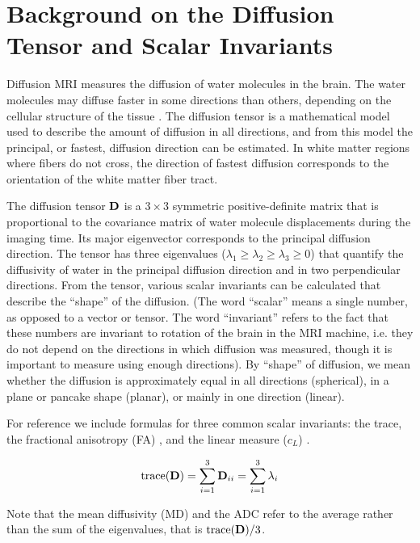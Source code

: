 \documentclass{InsightArticle}
\begin{document}
\section{Background on the Diffusion Tensor and Scalar Invariants}
Diffusion MRI measures the diffusion of water molecules in the brain.
The water molecules may diffuse faster in some directions than others,
depending on the cellular structure of the tissue \cite{beaulieu02,
pierpaoli96} . The diffusion tensor is a mathematical model
\cite{basserBIOPHYS94} used to describe the amount of diffusion in all
directions, and from this model the principal, or fastest, diffusion
direction can be estimated. In white matter regions where fibers do
not cross, the direction of fastest diffusion corresponds to the
orientation of the white matter fiber tract.

The diffusion tensor ${\bf D}$ is a $3 \times 3$ symmetric
positive-definite matrix that is proportional to the covariance matrix
of water molecule displacements during the imaging time.  Its major
eigenvector corresponds to the principal diffusion direction.  The
tensor has three eigenvalues ($\lambda_1 \geq \lambda_2 \geq \lambda_3
\geq 0$) that quantify the diffusivity of water in the principal
diffusion direction and in two perpendicular directions. From the
tensor, various scalar invariants can be calculated that describe the
``shape'' of the diffusion.  (The word ``scalar'' means a single
number, as opposed to a vector or tensor.  The word ``invariant''
refers to the fact that these numbers are invariant to rotation of the
brain in the MRI machine, i.e. they do not depend on the directions in
which diffusion was measured, though it is important to measure using
enough directions).  By ``shape'' of diffusion, we mean whether the
diffusion is approximately equal in all directions (spherical), in a
plane or pancake shape (planar), or mainly in one direction (linear).

For reference we include formulas for three common scalar invariants:
the trace, the fractional anisotropy (FA) \cite{basserJMR96}, and the
linear measure ($c_L$) \cite{westin02,westin97}.

\begin{equation}
  {\rm trace}({\bf D}) = \sum_{i=1}^{3}{\bf D}_{ii} = \sum_{i=1}^{3}\lambda_i
\end{equation}

Note that the mean diffusivity (MD) and the ADC refer to the average
rather than the sum of the eigenvalues, that is ${\rm trace}({\bf
D})/3$.
\end{document}
